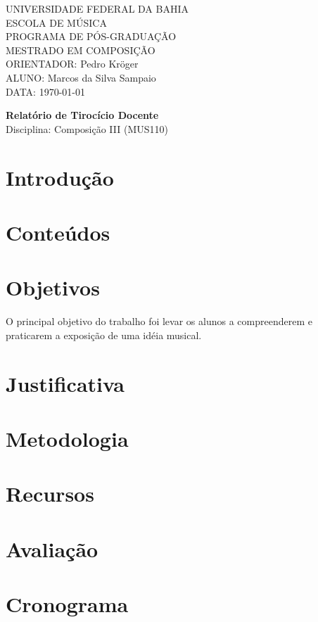\documentclass{article}
\begin{document}
\setlength{\parindent}{0cm}

\large
UNIVERSIDADE FEDERAL DA BAHIA \\
ESCOLA DE MÚSICA \\
PROGRAMA DE PÓS-GRADUAÇÃO \\
MESTRADO EM COMPOSIÇÃO \\
ORIENTADOR: Pedro Kröger \\
ALUNO: Marcos da Silva Sampaio \\
DATA: \today

\thispagestyle{empty}
\vspace{1cm}
\begin{center}{
    \Huge \textbf{Relatório de Tirocício Docente} \\
}
\vspace{12pt}
{\Large Disciplina: Composição III (MUS110)}

\end{center}
\vspace{1cm}

\section{Introdução}
\label{sec:introducao}

\section{Conteúdos}
\label{sec:conteudos}

\section{Objetivos}
\label{sec:objetivos}

O principal objetivo do trabalho foi levar os alunos a compreenderem e
praticarem a exposição de uma idéia musical.

\section{Justificativa}
\label{sec:justificativa}

\section{Metodologia}
\label{sec:metodologia}

\section{Recursos}
\label{sec:recursos}

\section{Avaliação}
\label{sec:avaliacao}

\section{Cronograma}
\label{sec:cronograma}

\renewcommand{\refname}{Bibliografia}

\nocite{Beethoven1970,Heussenstamm1987,adler89:_study_orches,Kennan1997,stone80:_music_notat_twent_centur}



\end{document}
